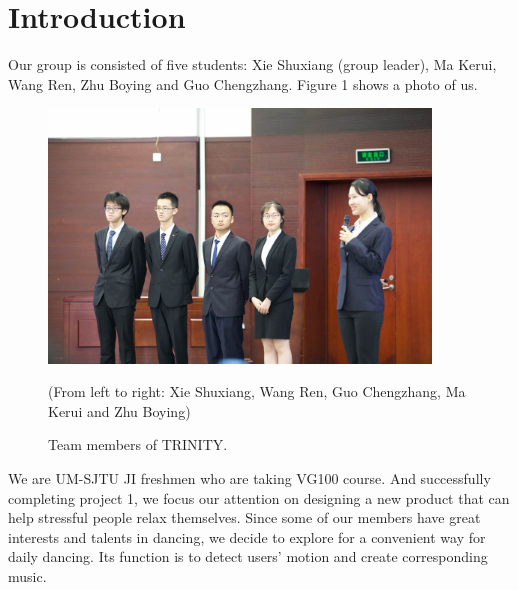 \section{Introduction}
\par Our group is consisted of five students: Xie Shuxiang (group leader), Ma
Kerui, Wang Ren, Zhu Boying and Guo Chengzhang. Figure 1 shows a photo of us. 
\begin{figure}[H]
    \centering
    \includegraphics[width=4in]{Pics/groupSym}
    \caption{Team members of TRINITY.}
    (From left to right: Xie Shuxiang, Wang Ren, Guo Chengzhang, Ma Kerui and
    Zhu Boying) 
\end{figure}

\par We are UM-SJTU JI freshmen who are taking VG100 course. And successfully
completing project 1, we focus our attention on designing a new product that can
help stressful people relax themselves. Since some of our members have great
interests and talents in dancing, we decide to explore for a convenient way for
daily dancing. Its function is to detect users' motion and create corresponding
music.